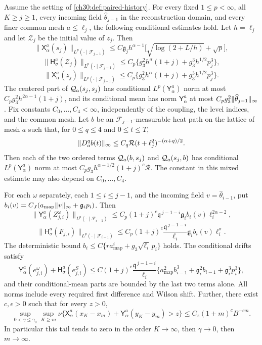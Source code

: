 \begin{theorem}\label{ch30:thm:uniform-component-maxima}
Assume the setting of \cref{ch30:def:paired-history}. For every fixed $1\le p<\infty$, all $K\ge j\ge1$, every incoming field $\widehat\theta_{j-1}$ in the reconstruction domain, and every finer common mesh $a\le\ell_j$, the following conditional estimates hold. Let $h=\ell_j$ and let $\mathcal Z_j$ be the initial value of $z_j$. Then
\[
 \bigl\lVert\mathsf X_\alpha^a(s_j)\bigr\rVert_{L^p(\cdot\mid\mathcal F_{j-1})}\le C\mathfrak g_jh^{\alpha-1}\bigl[\sqrt{\log(2+L/h)}+\sqrt p\bigr],
\]
\[
 \bigl\lVert\mathsf H_\sigma^a(\mathcal Z_j)\bigr\rVert_{L^p(\cdot\mid\mathcal F_{j-1})}\le C_p\bigl\{g_3^2h^\sigma(1+j)+g_3^3h^{1/2}p_j^3\bigr\},
\]
\[
 \bigl\lVert\mathsf X_\alpha^a(z_j)\bigr\rVert_{L^p(\cdot\mid\mathcal F_{j-1})}\le C_p\bigl\{g_3^2h^\alpha(1+j)+g_3^3h^{1/2}p_j^3\bigr\}.
\]
The centered part of $\mathcal Q_{a}(s_j,s_j)$ has conditional $L^p(\mathsf Y_\alpha^a)$ norm at most $C_pg_3^2h^{2\alpha-1}(1+j)$, and its conditional mean has norm $\mathsf Y_\alpha^a$ at most $C_pg_3^2\lVert \widehat\theta_{j-1}\rVert_\infty$. Fix constants $C_0,\ldots,C_4<\infty$, independently of the coupling, the level indices, and the common mesh. Let $b$ be an $\mathcal F_{j-1}$-measurable heat path on the lattice of mesh $a$ such that, for $0\le q\le4$ and $0\le t\le T$,
\[
 \lVert D_a^qb(t)\rVert_\infty\le C_q\mathcal R(t+\ell_j^2)^{-(\alpha+q)/2}.
\]
Then each of the two ordered terms $\mathcal Q_{a}(b,s_j)$ and $\mathcal Q_{a}(s_j,b)$ has conditional $L^p(\mathsf Y_\alpha^a)$ norm at most $C_pg_3h^{\alpha-1/2}(1+j)^c\mathcal R$. The constant in this mixed estimate may also depend on $C_0,\ldots,C_4$.

For each $\omega$ separately, each $1\le i\le j-1$, and the incoming field $v=\widehat\theta_{i-1}$, put $b_i(v)=C_J(a_{\mathrm{map}}\lVert v\rVert_\infty+\mathfrak g_ip_i)$. Then
\[
 \bigl\lVert\mathsf Y_\alpha^a(Z^\omega_{j,i})\bigr\rVert_{L^p(\cdot\mid\mathcal F_{i-1})}\le C_p(1+j)^c\mathfrak q^{\,j-1-i}\mathfrak g_ib_i(v)\ell_i^{2\alpha-2},
\]
\[
 \bigl\lVert\mathsf H_\sigma^a(F_{j,i})\bigr\rVert_{L^p(\cdot\mid\mathcal F_{i-1})}\le C_p(1+j)^c\frac{\mathfrak q^{\,j-1-i}}{\ell_i}\mathfrak g_ib_i(v)\ell_i^{\sigma}.
\]
The deterministic bound $b_i\le C\{ra_{\mathrm{map}}^i+g_3\sqrt{\ell_i}\,p_i\}$ holds. The conditional drifts satisfy
\[
 \mathsf Y_\alpha^a(e^\omega_{j,i})+\mathsf H_\sigma^a(e^S_{j,i})\le C(1+j)^c\frac{\mathfrak q^{\,j-1-i}}{\ell_i}\bigl\{a_{\mathrm{map}}^2b_{i-1}^3+\mathfrak g_i^2b_{i-1}+\mathfrak g_i^3p_i^3\bigr\},
\]
and their conditional-mean parts are bounded by the last two terms alone. All norms include every required first difference and Wilson shift. Further, there exist $c,\epsilon>0$ such that for every $z>0$,
\[
 \sup_{0<\gamma\le\gamma_0}\sup_{K\ge m}\nu\bigl\{\mathsf X_\alpha^a(x_K-x_m)+\mathsf Y_\alpha^a(y_K-y_m)>z\bigr\}\le C_z(1+m)^cB^{-\epsilon m}.
\]
In particular this tail tends to zero in the order $K\to\infty$, then $\gamma\to0$, then $m\to\infty$.
\end{theorem}

